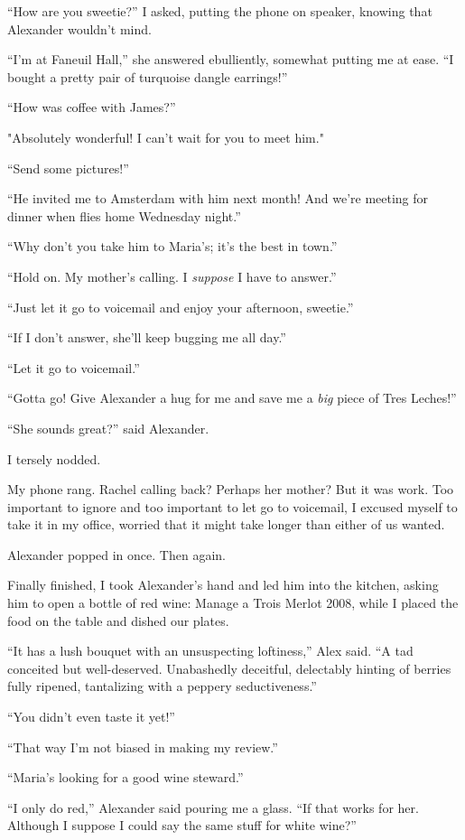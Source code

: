 ``How are you sweetie?'' I asked, putting the phone on speaker, knowing
that Alexander wouldn't mind.

``I'm at Faneuil Hall,'' she answered ebulliently, somewhat putting me
at ease. ``I bought a pretty pair of turquoise dangle earrings!''

``How was coffee with James?''

"Absolutely wonderful! I can't wait for you to meet him."

``Send some pictures!''

``He invited me to Amsterdam with him next month! And we're meeting for
dinner when flies home Wednesday night.''

``Why don't you take him to Maria's; it's the best in town.''

``Hold on. My mother's calling. I \emph{suppose} I have to answer.''

``Just let it go to voicemail and enjoy your afternoon, sweetie.''

``If I don't answer, she'll keep bugging me all day.''

``Let it go to voicemail.''

``Gotta go! Give Alexander a hug for me and save me a \emph{big} piece
of Tres Leches!''

``She sounds great?'' said Alexander.

I tersely nodded.

My phone rang. Rachel calling back? Perhaps her mother? But it was work.
Too important to ignore and too important to let go to voicemail, I
excused myself to take it in my office, worried that it might take
longer than either of us wanted.

Alexander popped in once. Then again.

Finally finished, I took Alexander's hand and led him into the kitchen,
asking him to open a bottle of red wine: Manage a Trois Merlot 2008,
while I placed the food on the table and dished our plates.

``It has a lush bouquet with an unsuspecting loftiness,'' Alex said. ``A
tad conceited but well-deserved. Unabashedly deceitful, delectably
hinting of berries fully ripened, tantalizing with a peppery
seductiveness.''

``You didn't even taste it yet!''

``That way I'm not biased in making my review.''

``Maria's looking for a good wine steward.''

``I only do red,'' Alexander said pouring me a glass. ``If that works
for her. Although I suppose I could say the same stuff for white wine?''


